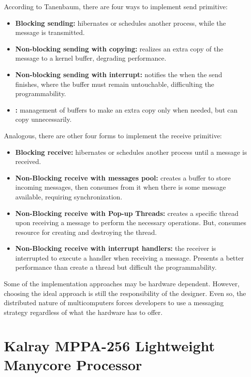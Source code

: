 				According to Tanenbaum, there are four ways to implement send primitive:
				\begin{itemize}
					\item \textbf{Blocking sending:} \cpu hibernates or schedules another
						process, while the message is transmitted.
					\item \textbf{Non-blocking sending with copying:} realizes an extra copy of
						the message to a kernel buffer, degrading performance.
					\item \textbf{Non-blocking sending with interrupt:} notifies the \cpu
						when the send finishes, where the buffer must remain untouchable,
						difficulting the programmability.
					\item \textbf{\cow:} management of buffers to make an extra copy only
						when needed, but can copy unnecessarily.
				\end{itemize}

				Analogous, there are other four forms to implement the receive primitive:
				\begin{itemize}
					\item \textbf{Blocking receive:} \cpu hibernates or schedules another
						process until a message is received.
					\item \textbf{Non-Blocking receive with messages pool:} \cpu creates
						a buffer to store incoming messages, then consumes from it when
						there is some message available, requiring synchronization.
					\item \textbf{Non-Blocking receive with Pop-up Threads:} creates a specific
						thread upon receiving a message to perform the necessary operations.
						But, consumes resource for creating and destroying the thread.
					\item \textbf{Non-Blocking receive with interrupt handlers:} the receiver
						is interrupted to execute a handler when receiving a message.
						Presents a better performance than create a thread but difficult
						the programmability.
				\end{itemize}

				Some of the implementation approaches may be hardware dependent.
				However, choosing the ideal approach is still the responsibility of the \os designer.
				Even so, the distributed nature of multicomputers forces developers to
				use a messaging strategy regardless of what the hardware has to offer.
	
	\section{Kalray MPPA-256 Lightweight Manycore Processor}
	\label{sec.mppa}

